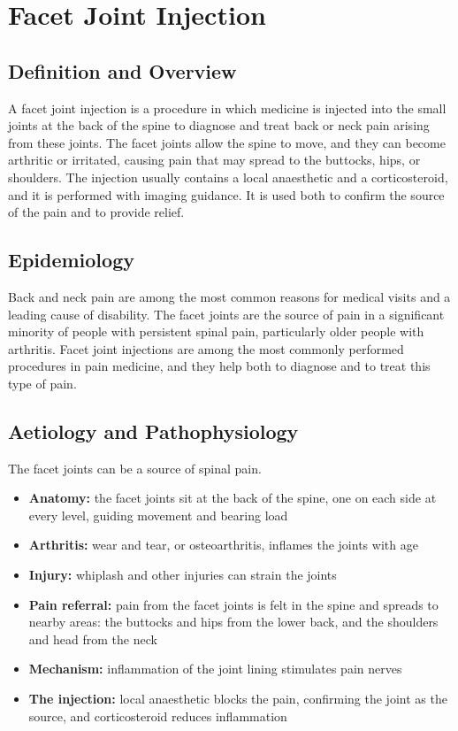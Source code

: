 \chapter{Facet Joint Injection}

\section*{Definition and Overview}
A facet joint injection is a procedure in which medicine is injected into the small joints at the back of the spine to diagnose and treat back or neck pain arising from these joints. The facet joints allow the spine to move, and they can become arthritic or irritated, causing pain that may spread to the buttocks, hips, or shoulders. The injection usually contains a local anaesthetic and a corticosteroid, and it is performed with imaging guidance. It is used both to confirm the source of the pain and to provide relief.

\section*{Epidemiology}
Back and neck pain are among the most common reasons for medical visits and a leading cause of disability. The facet joints are the source of pain in a significant minority of people with persistent spinal pain, particularly older people with arthritis. Facet joint injections are among the most commonly performed procedures in pain medicine, and they help both to diagnose and to treat this type of pain.

\section*{Aetiology and Pathophysiology}
The facet joints can be a source of spinal pain.
\begin{itemize}
    \item \textbf{Anatomy:} the facet joints sit at the back of the spine, one on each side at every level, guiding movement and bearing load
    \item \textbf{Arthritis:} wear and tear, or osteoarthritis, inflames the joints with age
    \item \textbf{Injury:} whiplash and other injuries can strain the joints
    \item \textbf{Pain referral:} pain from the facet joints is felt in the spine and spreads to nearby areas: the buttocks and hips from the lower back, and the shoulders and head from the neck
    \item \textbf{Mechanism:} inflammation of the joint lining stimulates pain nerves
    \item \textbf{The injection:} local anaesthetic blocks the pain, confirming the joint as the source, and corticosteroid reduces inflammation
\end{itemize}

